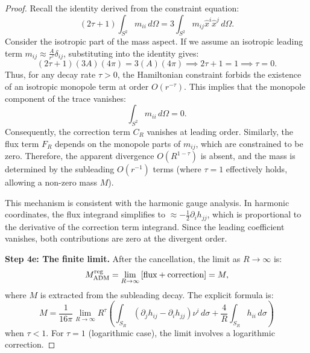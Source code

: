 \begin{proof}
Recall the identity derived from the constraint equation:
\begin{equation}
    (2\tau + 1) \int_{S^2} m_{ii} \, d\Omega = 3 \int_{S^2} m_{ij} \hat{x}^i \hat{x}^j \, d\Omega.
\end{equation}
Consider the isotropic part of the mass aspect. If we assume an isotropic leading term $m_{ij} \approx \frac{A}{r^\tau} \delta_{ij}$, substituting into the identity gives:
\begin{equation}
    (2\tau + 1) (3A) (4\pi) = 3 (A) (4\pi) \implies 2\tau + 1 = 1 \implies \tau = 0.
\end{equation}
Thus, for any decay rate $\tau > 0$, the Hamiltonian constraint forbids the existence of an isotropic monopole term at order $O(r^{-\tau})$. This implies that the monopole component of the trace vanishes:
\begin{equation}
    \int_{S^2} m_{ii} \, d\Omega = 0.
\end{equation}
Consequently, the correction term $C_R$ vanishes at leading order. Similarly, the flux term $F_R$ depends on the monopole parts of $m_{ij}$, which are constrained to be zero.
Therefore, the apparent divergence $O(R^{1-\tau})$ is absent, and the mass is determined by the subleading $O(r^{-1})$ terms (where $\tau=1$ effectively holds, allowing a non-zero mass $M$).

This mechanism is consistent with the harmonic gauge analysis. In harmonic coordinates, the flux integrand simplifies to $\approx -\frac{1}{2} \partial_i h_{jj}$, which is proportional to the derivative of the correction term integrand. Since the leading coefficient vanishes, both contributions are zero at the divergent order.

\textbf{Step 4e: The finite limit.}
After the cancellation, the limit as $R \to \infty$ is:
\begin{equation}
    M_{\mathrm{ADM}}^{\text{reg}} = \lim_{R \to \infty} \left[ \text{flux} + \text{correction} \right] = M,
\end{equation}
where $M$ is extracted from the subleading decay. The explicit formula is:
\begin{equation}
    M = \frac{1}{16\pi} \lim_{R \to \infty} R^{\tau} \left( \int_{S_R} (\partial_j h_{ij} - \partial_i h_{jj}) \nu^i \, d\sigma + \frac{4}{R} \int_{S_R} h_{ii} \, d\sigma \right)
\end{equation}
when $\tau < 1$. For $\tau = 1$ (logarithmic case), the limit involves a logarithmic correction.


\end{proof}
